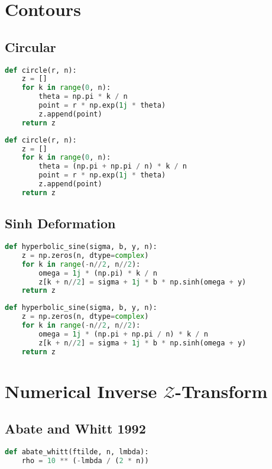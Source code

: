 \begin{appendices}
\newpage
\section{Contours}

\subsection{Circular}
\begin{lstlisting}[language=Python, caption= null]
def circle(r, n):
    z = []
    for k in range(0, n):
        theta = np.pi * k / n
        point = r * np.exp(1j * theta)
        z.append(point)
    return z
\end{lstlisting}

\begin{lstlisting}[language=Python, caption= null]
def circle(r, n):
    z = []
    for k in range(0, n):
        theta = (np.pi + np.pi / n) * k / n
        point = r * np.exp(1j * theta)
        z.append(point)
    return z
\end{lstlisting}

\subsection{Sinh Deformation}
\begin{lstlisting}[language=Python, caption= null]
def hyperbolic_sine(sigma, b, y, n):
    z = np.zeros(n, dtype=complex)
    for k in range(-n//2, n//2):
        omega = 1j * (np.pi) * k / n
        z[k + n//2] = sigma + 1j * b * np.sinh(omega + y)
    return z
\end{lstlisting}

\begin{lstlisting}[language=Python, caption= null]
def hyperbolic_sine(sigma, b, y, n):
    z = np.zeros(n, dtype=complex)
    for k in range(-n//2, n//2):
        omega = 1j * (np.pi + np.pi / n) * k / n
        z[k + n//2] = sigma + 1j * b * np.sinh(omega + y)
    return z
\end{lstlisting}

\newpage
\section{Numerical Inverse $\mathcal{Z}$-Transform}

\subsection{Abate and Whitt 1992}
\begin{lstlisting}[language=Python, caption= null ]
def abate_whitt(ftilde, n, lmbda):
    rho = 10 ** (-lmbda / (2 * n))


\end{lstlisting}
\end{appendices}

